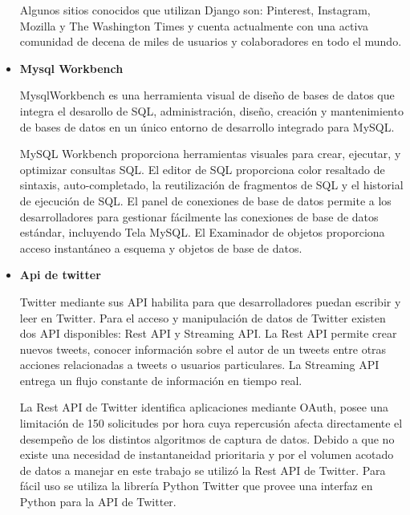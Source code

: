 \begin{itemize}
	Algunos sitios conocidos que utilizan Django son: Pinterest, Instagram, Mozilla y The Washington Times y cuenta actualmente con una activa comunidad de decena de miles de usuarios y colaboradores en todo el mundo.
	
	\item \textbf{Mysql Workbench}
	
	MysqlWorkbench \cite{mysqlWorkbenchWeb} es una herramienta visual de diseño de bases de datos que integra el desarollo de SQL, administración, diseño, creación y mantenimiento de bases de datos en un único entorno de desarrollo integrado para MySQL.
	
	MySQL Workbench proporciona herramientas visuales para crear, ejecutar, y optimizar consultas SQL. El editor de SQL proporciona color resaltado de sintaxis, auto-completado, la reutilización de fragmentos de SQL y el historial de ejecución de SQL. El panel de conexiones de base de datos permite a los desarrolladores para gestionar fácilmente las conexiones de base de datos estándar, incluyendo Tela MySQL. El Examinador de objetos proporciona acceso instantáneo a esquema y objetos de base de datos.
	
	\item \textbf{Api de twitter}
	
	Twitter mediante sus API \cite{twitterWeb} habilita para que desarrolladores puedan escribir y leer en Twitter. Para el acceso y manipulación de datos de Twitter existen dos API disponibles: Rest API y Streaming API. La Rest API permite crear nuevos tweets, conocer información sobre el autor de un tweets entre otras acciones relacionadas a tweets o usuarios particulares. La Streaming API entrega un flujo constante de información en tiempo real.
	
	La Rest API de Twitter identifica aplicaciones mediante OAuth, posee una limitación de 150 solicitudes por hora cuya repercusión afecta directamente el desempeño de los distintos algoritmos de captura de datos. Debido a que no existe una necesidad de instantaneidad prioritaria y por el volumen acotado de datos a manejar en este trabajo se utilizó la Rest API de Twitter. Para fácil uso se utiliza la librería Python Twitter \cite{pythonTwitterCode} \cite{pythonTwitterGithub} que provee una interfaz en Python para la API de Twitter. 
	
	
	\end{itemize}